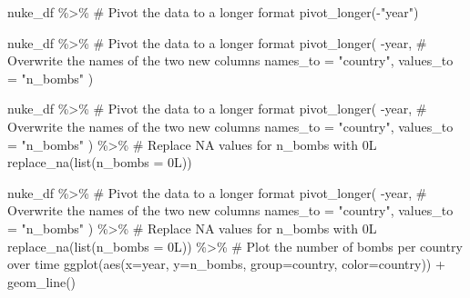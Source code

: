 \documentclass[
  letterpaper,
  DIV=11,
  numbers=noendperiod]{scrreprt}
\newenvironment{Shaded}{\begin{snugshade}}{\end{snugshade}}
\newcommand{\AttributeTok}[1]{\textcolor[rgb]{0.40,0.45,0.13}{#1}}
\newcommand{\CommentTok}[1]{\textcolor[rgb]{0.37,0.37,0.37}{#1}}
\newcommand{\FunctionTok}[1]{\textcolor[rgb]{0.28,0.35,0.67}{#1}}
\newcommand{\NormalTok}[1]{\textcolor[rgb]{0.00,0.23,0.31}{#1}}
\newcommand{\SpecialCharTok}[1]{\textcolor[rgb]{0.37,0.37,0.37}{#1}}
\newcommand{\StringTok}[1]{\textcolor[rgb]{0.13,0.47,0.30}{#1}}
\begin{document}
\begin{Shaded}
\begin{Highlighting}[]
\NormalTok{nuke\_df }\SpecialCharTok{\%\textgreater{}\%} 
  \CommentTok{\# Pivot the data to a longer format}
  \FunctionTok{pivot\_longer}\NormalTok{(}\SpecialCharTok{{-}}\StringTok{"year"}\NormalTok{)}

\NormalTok{nuke\_df }\SpecialCharTok{\%\textgreater{}\%} 
  \CommentTok{\# Pivot the data to a longer format}
  \FunctionTok{pivot\_longer}\NormalTok{(}
    \SpecialCharTok{{-}}\NormalTok{year, }
    \CommentTok{\# Overwrite the names of the two new columns}
    \AttributeTok{names\_to =} \StringTok{"country"}\NormalTok{, }
    \AttributeTok{values\_to =} \StringTok{"n\_bombs"}
\NormalTok{  )}

\NormalTok{nuke\_df }\SpecialCharTok{\%\textgreater{}\%} 
  \CommentTok{\# Pivot the data to a longer format}
  \FunctionTok{pivot\_longer}\NormalTok{(}
    \SpecialCharTok{{-}}\NormalTok{year, }
    \CommentTok{\# Overwrite the names of the two new columns}
    \AttributeTok{names\_to =} \StringTok{"country"}\NormalTok{, }
    \AttributeTok{values\_to =} \StringTok{"n\_bombs"}
\NormalTok{  ) }\SpecialCharTok{\%\textgreater{}\%}
  \CommentTok{\# Replace NA values for n\_bombs with 0L}
  \FunctionTok{replace\_na}\NormalTok{(}\FunctionTok{list}\NormalTok{(}\AttributeTok{n\_bombs =}\NormalTok{ 0L))}

\NormalTok{  nuke\_df }\SpecialCharTok{\%\textgreater{}\%} 
  \CommentTok{\# Pivot the data to a longer format}
  \FunctionTok{pivot\_longer}\NormalTok{(}
    \SpecialCharTok{{-}}\NormalTok{year, }
    \CommentTok{\# Overwrite the names of the two new columns}
    \AttributeTok{names\_to =} \StringTok{"country"}\NormalTok{, }
    \AttributeTok{values\_to =} \StringTok{"n\_bombs"}
\NormalTok{  ) }\SpecialCharTok{\%\textgreater{}\%} 
  \CommentTok{\# Replace NA values for n\_bombs with 0L}
  \FunctionTok{replace\_na}\NormalTok{(}\FunctionTok{list}\NormalTok{(}\AttributeTok{n\_bombs =}\NormalTok{ 0L)) }\SpecialCharTok{\%\textgreater{}\%} 
  \CommentTok{\# Plot the number of bombs per country over time}
  \FunctionTok{ggplot}\NormalTok{(}\FunctionTok{aes}\NormalTok{(}\AttributeTok{x=}\NormalTok{year, }\AttributeTok{y=}\NormalTok{n\_bombs, }\AttributeTok{group=}\NormalTok{country, }\AttributeTok{color=}\NormalTok{country)) }\SpecialCharTok{+}
    \FunctionTok{geom\_line}\NormalTok{()}

\end{Highlighting}
\end{Shaded}
\end{document}
